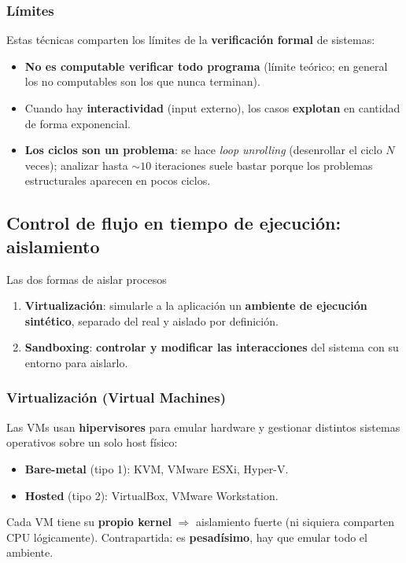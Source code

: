 \documentclass[11pt,a4paper]{article}
\begin{document}
\subsubsection{Límites}
Estas técnicas comparten los límites de la \textbf{verificación formal} de sistemas:
\begin{itemize}[leftmargin=1.4em,itemsep=1pt]
  \item \textbf{No es computable verificar todo programa} (límite teórico; en general los no
        computables son los que nunca terminan).
  \item Cuando hay \textbf{interactividad} (input externo), los casos \textbf{explotan} en
        cantidad de forma exponencial.
  \item \textbf{Los ciclos son un problema}: se hace \emph{loop unrolling} (desenrollar el ciclo
        $N$ veces); analizar hasta $\sim 10$ iteraciones suele bastar porque los problemas
        estructurales aparecen en pocos ciclos.
\end{itemize}

\subsection{Control de flujo en tiempo de ejecución: aislamiento}

\begin{defbox}{Las dos formas de aislar procesos}
\begin{enumerate}[leftmargin=1.6em,itemsep=2pt]
  \item \textbf{Virtualización}: simularle a la aplicación un \textbf{ambiente de ejecución
        sintético}, separado del real y aislado por definición.
  \item \textbf{Sandboxing}: \textbf{controlar y modificar las interacciones} del sistema con su
        entorno para aislarlo.
\end{enumerate}
\end{defbox}

\subsubsection{Virtualización (Virtual Machines)}
Las VMs usan \textbf{hipervisores} para emular hardware y gestionar distintos sistemas
operativos sobre un solo host físico:
\begin{itemize}[leftmargin=1.4em,itemsep=1pt]
  \item \textbf{Bare-metal} (tipo 1): KVM, VMware ESXi, Hyper-V.
  \item \textbf{Hosted} (tipo 2): VirtualBox, VMware Workstation.
\end{itemize}
Cada VM tiene su \textbf{propio kernel} $\Rightarrow$ aislamiento fuerte (ni siquiera comparten
CPU lógicamente). Contrapartida: es \textbf{pesadísimo}, hay que emular todo el ambiente.
\end{document}
